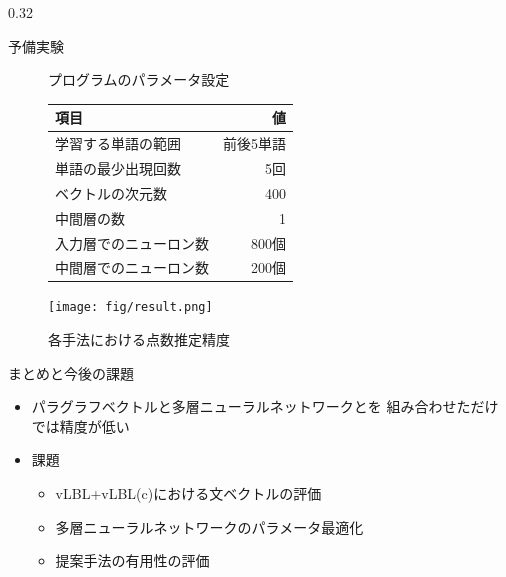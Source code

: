 \documentclass[8pt,unicode]{beamer}
\newcommand{\columnscale}{0.32}
\begin{document}
\begin{frame}{}
\begin{columns}[t]
\begin{column}{\columnscale\textwidth}
\begin{block}{予備実験}
    \vspace{-2em} %
    \begin{figure}
      \centering
      \begin{minipage}[t]{0.45\textwidth}
        \centering
        \small
        \caption{\small プログラムのパラメータ設定}
        \begin{tabular}{l | r}
          項目 & 値 \\
          \hline
          学習する単語の範囲 & 前後5単語 \\
          単語の最少出現回数 & 5回 \\
          ベクトルの次元数 & 400 \\
          中間層の数 & 1 \\
          入力層でのニューロン数 & 800個 \\
          中間層でのニューロン数 & 200個
        \end{tabular}
      \end{minipage}\hfill
      \begin{minipage}[t]{0.45\textwidth}
        \centering
        \vspace{0em}
        \texttt{[image: fig/result.png]}
        \caption{\small 各手法における点数推定精度}
      \end{minipage}
    \end{figure}
  \end{block} %

  \begin{block}{まとめと今後の課題}
    \begin{itemize}
      \item パラグラフベクトルと多層ニューラルネットワークとを
        組み合わせただけでは精度が低い
      \item 課題
        \begin{itemize}
          \item vLBL+vLBL(c)における文ベクトルの評価
          \item 多層ニューラルネットワークのパラメータ最適化
          \item 提案手法の有用性の評価
        \end{itemize}
    \end{itemize}
  \end{block} %


\end{column}
\end{columns}
\end{frame}
\end{document}
